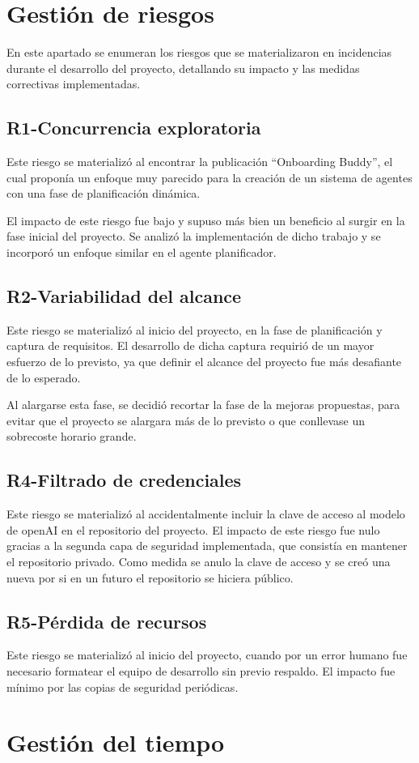 \section{Gestión de riesgos}
En este apartado se enumeran los riesgos que se materializaron en incidencias durante el desarrollo del proyecto, detallando su impacto y las medidas correctivas implementadas.

\subsection{R1-Concurrencia exploratoria}
Este riesgo se materializó al encontrar la publicación ``Onboarding Buddy'', el cual proponía un enfoque muy parecido para la creación de un sistema de agentes con una fase de planificación dinámica. 

El impacto de este riesgo fue bajo y supuso más bien un beneficio al surgir en la fase inicial del proyecto. Se analizó la implementación de dicho trabajo y se incorporó un enfoque similar en el agente planificador. 

\subsection{R2-Variabilidad del alcance}
Este riesgo se materializó al inicio del proyecto, en la fase de planificación y captura de requisitos. El desarrollo de dicha captura requirió de un mayor esfuerzo de lo previsto, ya que definir el alcance del proyecto fue más desafiante de lo esperado. 

Al alargarse esta fase, se decidió recortar la fase de la mejoras propuestas, para evitar que el proyecto se alargara más de lo previsto o que conllevase un sobrecoste horario grande.

\subsection{R4-Filtrado de credenciales}
Este riesgo se materializó al accidentalmente incluir la clave de acceso al modelo de openAI en el repositorio del proyecto. El impacto de este riesgo fue nulo gracias a la segunda capa de seguridad implementada, que consistía en mantener el repositorio privado. Como medida se anulo la clave de acceso y se creó una nueva por si en un futuro el repositorio se hiciera público.

\subsection{R5-Pérdida de recursos}
Este riesgo se materializó al inicio del proyecto, cuando por un error humano fue necesario formatear el equipo de desarrollo sin previo respaldo. El impacto fue mínimo por las copias de seguridad periódicas.

\section{Gestión del tiempo}

\section{}
